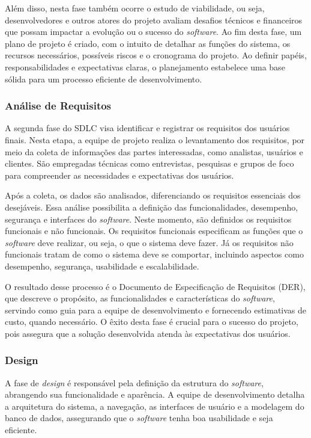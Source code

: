 Além disso, nesta fase também ocorre o estudo de viabilidade, ou seja, desenvolvedores e outros atores do projeto avaliam desafios técnicos e financeiros que possam impactar a evolução ou o sucesso do \textit{software}. Ao fim desta fase, um plano de projeto é criado, com o intuito de detalhar as funções do sistema, os recursos necessários, possíveis riscos e o cronograma do projeto. Ao definir papéis, responsabilidades e expectativas claras, o planejamento estabelece uma base sólida para um processo eficiente de desenvolvimento.

\subsubsection{Análise de Requisitos}

A segunda fase do SDLC visa identificar e registrar os requisitos dos usuários finais. Nesta etapa, a equipe de projeto realiza o levantamento dos requisitos, por meio da coleta de informações das partes interessadas, como analistas, usuários e clientes. São empregadas técnicas como entrevistas, pesquisas e grupos de foco para compreender as necessidades e expectativas dos usuários.

Após a coleta, os dados são analisados, diferenciando os requisitos essenciais dos desejáveis. Essa análise possibilita a definição das funcionalidades, desempenho, segurança e interfaces do \textit{software}. Neste momento, são definidos os requisitos funcionais e não funcionais. Os requisitos funcionais especificam as funções que o \textit{software} deve realizar, ou seja, o que o sistema deve fazer. Já os requisitos não funcionais tratam de como o sistema deve se comportar, incluindo aspectos como desempenho, segurança, usabilidade e escalabilidade.

O resultado desse processo é o Documento de Especificação de Requisitos (DER), que descreve o propósito, as funcionalidades e características do \textit{software}, servindo como guia para a equipe de desenvolvimento e fornecendo estimativas de custo, quando necessário. O êxito desta fase é crucial para o sucesso do projeto, pois assegura que a solução desenvolvida atenda às expectativas dos usuários.

\subsubsection{Design}

A fase de \textit{design} é responsável pela definição da estrutura do \textit{software}, abrangendo sua funcionalidade e aparência. A equipe de desenvolvimento detalha a arquitetura do sistema, a navegação, as interfaces de usuário e a modelagem do banco de dados, assegurando que o \textit{software} tenha boa usabilidade e seja eficiente.

